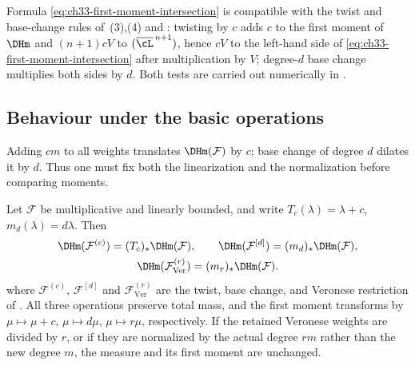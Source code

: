 \begin{remark}
\label{rem:ch33-dh-unit-tests}
Formula \eqref{eq:ch33-first-moment-intersection} is compatible with the
twist and base-change rules of
\,(3),(4) and
: twisting by $c$ adds $c$ to the
first moment of $\DHm$ and $(n+1)cV$ to $(\overline\cL^{\,n+1})$,
hence $cV$ to the left-hand side of
\eqref{eq:ch33-first-moment-intersection} after multiplication by $V$;
degree-$d$ base change multiplies both sides by $d$.  Both tests are
carried out numerically in .
\end{remark}

\subsection{Behaviour under the basic operations}
\label{sec:ch33-dh-operations}

Adding $cm$ to all weights translates $\DHm(\mathcal F)$ by $c$;
base change of degree $d$ dilates it by $d$.  Thus one must fix both the
linearization and the normalization before comparing moments.

\begin{proposition}
\label{prop:ch33-dh-transformations}
Let $\mathcal F$ be multiplicative and linearly bounded, and write
$T_c(\lambda)=\lambda+c$, $m_d(\lambda)=d\lambda$.  Then
\begin{equation}
\label{eq:ch33-dh-transform}
\begin{gathered}
 \DHm(\mathcal F^{(c)})=(T_c)_\ast\DHm(\mathcal F),
 \qquad
 \DHm(\mathcal F^{[d]})=(m_d)_\ast\DHm(\mathcal F),\\
 \DHm(\mathcal F^{(r)}_{\mathrm{Ver}})
   =(m_r)_\ast\DHm(\mathcal F).
\end{gathered}
\end{equation}
where $\mathcal F^{(c)}$, $\mathcal F^{[d]}$ and
$\mathcal F^{(r)}_{\mathrm{Ver}}$ are the twist, base change, and
Veronese restriction of .  All three
operations preserve total mass, and the first moment transforms by
$\mu\mapsto\mu+c$, $\mu\mapsto d\mu$, $\mu\mapsto r\mu$,
respectively.  If the retained Veronese weights are divided by $r$, or
if they are normalized by the actual degree $rm$ rather than the new
degree $m$, the measure and its first moment are unchanged.
\end{proposition}

